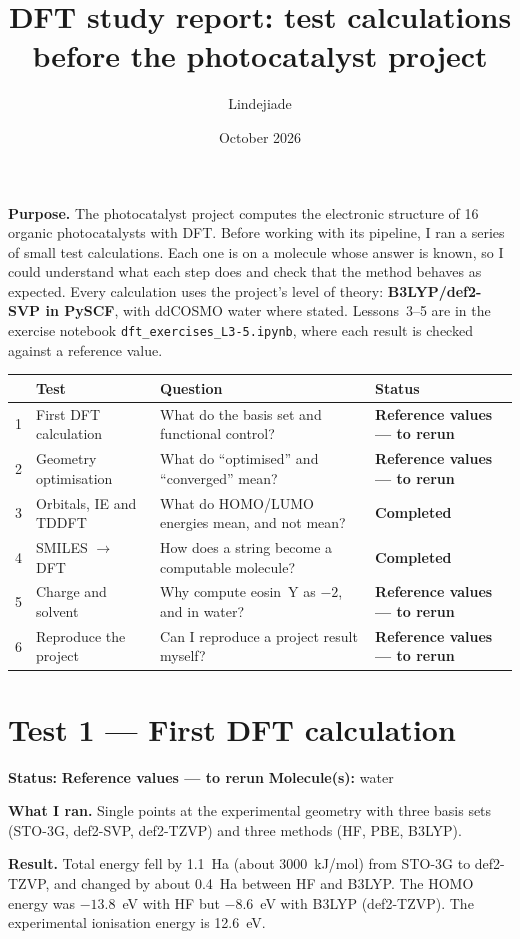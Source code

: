 \documentclass[11pt,a4paper]{article}
\title{DFT study report: test calculations before the photocatalyst project}
\author{Lindejiade}
\date{October 2026}
\newcommand{\done}{\textcolor{green!45!black}{\textbf{Completed}}}
\newcommand{\torun}{\textcolor{orange!80!black}{\textbf{Reference values --- to rerun}}}
\newcommand{\lab}[3]{\section{#1}\noindent\textbf{Status:} #2 \qquad \textbf{Molecule(s):} #3\par}
\begin{document}
\maketitle

\noindent\textbf{Purpose.} The photocatalyst project computes the electronic structure of 16
organic photocatalysts with DFT. Before working with its pipeline, I ran a series of small test
calculations. Each one is on a molecule whose answer is known, so I could understand what each
step does and check that the method behaves as expected. Every calculation uses the project's
level of theory: \textbf{B3LYP/def2-SVP in PySCF}, with ddCOSMO water where stated. Lessons~3--5
are in the exercise notebook \texttt{dft\_exercises\_L3-5.ipynb}, where each result is checked
against a reference value.

\begin{center}\small
\begin{tabularx}{\linewidth}{@{}clXl@{}}
\toprule
& Test & Question & Status \\
\midrule
1 & First DFT calculation & What do the basis set and functional control? & \torun \\
2 & Geometry optimisation & What do ``optimised'' and ``converged'' mean? & \torun \\
3 & Orbitals, IE and TDDFT & What do HOMO/LUMO energies mean, and not mean? & \done \\
4 & SMILES $\to$ DFT & How does a string become a computable molecule? & \done \\
5 & Charge and solvent & Why compute eosin~Y as $-2$, and in water? & \torun \\
6 & Reproduce the project & Can I reproduce a project result myself? & \torun \\
\bottomrule
\end{tabularx}
\end{center}

\lab{Test 1 --- First DFT calculation}{\torun}{water}

\textbf{What I ran.} Single points at the experimental geometry with three basis sets (STO-3G,
def2-SVP, def2-TZVP) and three methods (HF, PBE, B3LYP).

\textbf{Result.} Total energy fell by 1.1~Ha (about 3000~kJ/mol) from STO-3G to def2-TZVP, and
changed by about 0.4~Ha between HF and B3LYP. The HOMO energy was $-13.8$~eV with HF but
$-8.6$~eV with B3LYP (def2-TZVP). The experimental ionisation energy is 12.6~eV.
\end{document}
